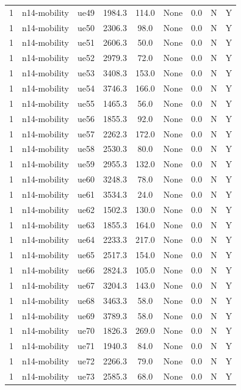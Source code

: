 \begin{table}[ht]
\begin{tabular}{|c|c|c|c|c|c|c|c|c|}
1 & n14-mobility & ue49 & 1984.3 & 114.0 & None & 0.0 & N & Y \\
1 & n14-mobility & ue50 & 2306.3 & 98.0 & None & 0.0 & N & Y \\
1 & n14-mobility & ue51 & 2606.3 & 50.0 & None & 0.0 & N & Y \\
1 & n14-mobility & ue52 & 2979.3 & 72.0 & None & 0.0 & N & Y \\
1 & n14-mobility & ue53 & 3408.3 & 153.0 & None & 0.0 & N & Y \\
1 & n14-mobility & ue54 & 3746.3 & 166.0 & None & 0.0 & N & Y \\
1 & n14-mobility & ue55 & 1465.3 & 56.0 & None & 0.0 & N & Y \\
1 & n14-mobility & ue56 & 1855.3 & 92.0 & None & 0.0 & N & Y \\
1 & n14-mobility & ue57 & 2262.3 & 172.0 & None & 0.0 & N & Y \\
1 & n14-mobility & ue58 & 2530.3 & 80.0 & None & 0.0 & N & Y \\
1 & n14-mobility & ue59 & 2955.3 & 132.0 & None & 0.0 & N & Y \\
1 & n14-mobility & ue60 & 3248.3 & 78.0 & None & 0.0 & N & Y \\
1 & n14-mobility & ue61 & 3534.3 & 24.0 & None & 0.0 & N & Y \\
1 & n14-mobility & ue62 & 1502.3 & 130.0 & None & 0.0 & N & Y \\
1 & n14-mobility & ue63 & 1855.3 & 164.0 & None & 0.0 & N & Y \\
1 & n14-mobility & ue64 & 2233.3 & 217.0 & None & 0.0 & N & Y \\
1 & n14-mobility & ue65 & 2517.3 & 154.0 & None & 0.0 & N & Y \\
1 & n14-mobility & ue66 & 2824.3 & 105.0 & None & 0.0 & N & Y \\
1 & n14-mobility & ue67 & 3204.3 & 143.0 & None & 0.0 & N & Y \\
1 & n14-mobility & ue68 & 3463.3 & 58.0 & None & 0.0 & N & Y \\
1 & n14-mobility & ue69 & 3789.3 & 58.0 & None & 0.0 & N & Y \\
1 & n14-mobility & ue70 & 1826.3 & 269.0 & None & 0.0 & N & Y \\
1 & n14-mobility & ue71 & 1940.3 & 84.0 & None & 0.0 & N & Y \\
1 & n14-mobility & ue72 & 2266.3 & 79.0 & None & 0.0 & N & Y \\
1 & n14-mobility & ue73 & 2585.3 & 68.0 & None & 0.0 & N & Y \\

\end{tabular}
\end{table}
